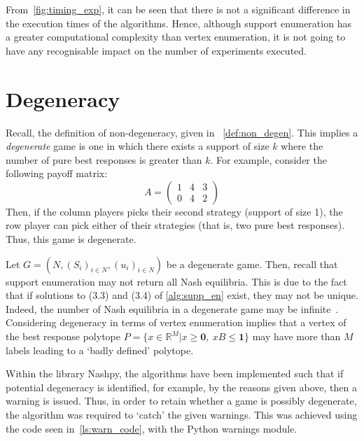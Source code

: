 From~\autoref{fig:timing_exp}, it can be seen that there is not a significant
difference in the execution times of the algorithms. Hence, although support
enumeration has a greater computational complexity than vertex enumeration, it
is not going to have any recognisable impact on the number of experiments
executed.


\section{Degeneracy}\label{sec:Degeneracy}
Recall, the definition of non-degeneracy, given in
~\autoref{def:non_degen}. This implies a \textit{degenerate} game is one in
which there exists a support of size \(k\) where the number of pure best
responses is greater than \(k\). For example, consider the following payoff
matrix:
\begin{equation}
    A = \begin{pmatrix}
        1 & 4 & 3\\
        0 & 4 & 2
    \end{pmatrix}
\end{equation}
Then, if the column players picks their second strategy (support of size 1),
the row player can pick either of their strategies (that is, two pure best
responses). Thus, this game is degenerate.

Let \(G = (N, {(S_{i})}_{i \in N}, {(u_{i})}_{i \in N})\) be a degenerate game.
Then, recall that support enumeration may not return all Nash equilibria. This
is due to the fact that if solutions to (3.3) and (3.4) of \autoref{alg:supp_en} exist, they may not be unique. Indeed, the number of
Nash equilibria in a degenerate game may be infinite~\cite{NoamNisan2007}.
Considering degeneracy in terms of vertex enumeration implies that a vertex of
the best response polytope \(P = \{x \in \mathbb{R}^{M} | x \ge \textbf{0}, ~ xB
\le \textbf{1}\} \) may have more than \(M\) labels leading to a `badly defined'
polytope.

Within the library Nashpy, the algorithms have been implemented such that if
potential degeneracy is identified, for example, by the reasons given above, then
a warning is issued. Thus, in order to retain whether a game is possibly
degenerate, the algorithm was required to `catch' the given warnings. This
was achieved using the code seen in~\autoref{ls:warn_code}, with the Python
warnings module.

